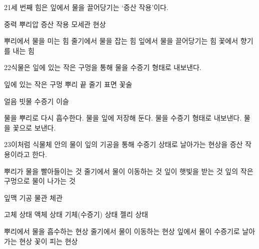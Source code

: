 \documentclass[fs85,seriesRus]{korfarm-base}
\begin{document}
\begin{kfSentenceUnit}{21}{세 번째 힘은 잎에서 물을 끌어당기는 ‘증산 작용’이다.}
\begin{kfChoices}
\kfChoice 중력
\kfChoice 뿌리압
\kfChoice 증산 작용
\kfChoice 모세관 현상
\end{kfChoices}
\begin{kfChoices}
\kfChoice 뿌리에서 물을 미는 힘
\kfChoice 줄기에서 물을 잡는 힘
\kfChoice 잎에서 물을 끌어당기는 힘
\kfChoice 꽃에서 향기를 내는 힘
\end{kfChoices}
\end{kfSentenceUnit}

\begin{kfSentenceUnit}{22}{식물은 잎에 있는 작은 구멍을 통해 물을 수증기 형태로 내보낸다.}
\begin{kfChoices}
\kfChoice 잎에 있는 작은 구멍
\kfChoice 뿌리 끝
\kfChoice 줄기 표면
\kfChoice 꽃술
\end{kfChoices}
\begin{kfChoices}
\kfChoice 얼음
\kfChoice 빗물
\kfChoice 수증기
\kfChoice 이슬
\end{kfChoices}
\begin{kfChoices}
\kfChoice 물을 뿌리로 다시 흡수한다.
\kfChoice 물을 잎에 저장해 둔다.
\kfChoice 물을 수증기 형태로 내보낸다.
\kfChoice 물을 꽃으로 보낸다.
\end{kfChoices}
\end{kfSentenceUnit}

\begin{kfSentenceUnit}{23}{이처럼 식물체 안의 물이 잎의 기공을 통해 수증기 상태로 날아가는 현상을 증산 작용이라고 한다.}
\begin{kfChoices}
\kfChoice 뿌리가 물을 빨아들이는 것
\kfChoice 줄기에서 물이 이동하는 것
\kfChoice 잎이 햇빛을 받는 것
\kfChoice 잎의 작은 구멍으로 물이 나가는 것
\end{kfChoices}
\begin{kfChoices}
\kfChoice 잎맥
\kfChoice 기공
\kfChoice 물관
\kfChoice 체관
\end{kfChoices}
\begin{kfChoices}
\kfChoice 고체 상태
\kfChoice 액체 상태
\kfChoice 기체(수증기) 상태
\kfChoice 젤리 상태
\end{kfChoices}
\begin{kfChoices}
\kfChoice 뿌리에서 물을 흡수하는 현상
\kfChoice 줄기에서 물이 이동하는 현상
\kfChoice 잎에서 물이 수증기로 날아가는 현상
\kfChoice 꽃이 피는 현상
\end{kfChoices}
\end{kfSentenceUnit}
\end{document}
